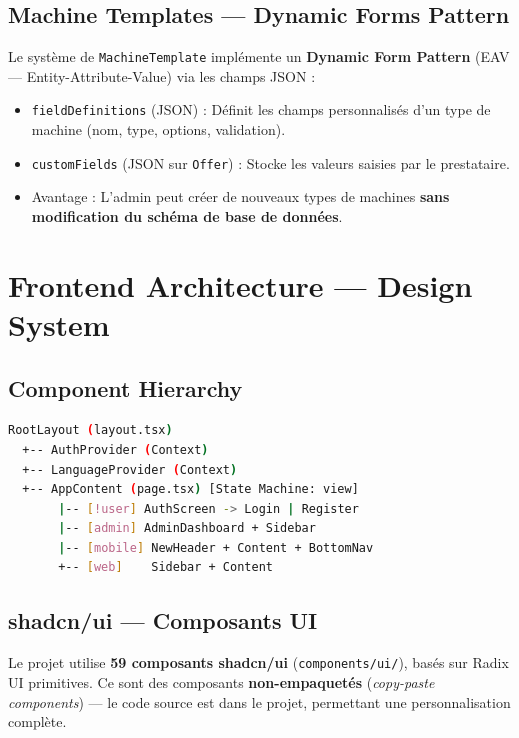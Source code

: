 \documentclass[12pt, a4paper]{article}
\begin{document}
\subsection{Machine Templates — Dynamic Forms Pattern}

Le système de \texttt{MachineTemplate} implémente un \textbf{Dynamic Form Pattern} (EAV — Entity-Attribute-Value) via les champs JSON :

\begin{itemize}[leftmargin=2em]
  \item \texttt{fieldDefinitions} (JSON) : Définit les champs personnalisés d'un type de machine (nom, type, options, validation).
  \item \texttt{customFields} (JSON sur \texttt{Offer}) : Stocke les valeurs saisies par le prestataire.
  \item Avantage : L'admin peut créer de nouveaux types de machines \textbf{sans modification du schéma de base de données}.
\end{itemize}

\section{Frontend Architecture — Design System}

\subsection{Component Hierarchy}

\begin{lstlisting}[language=bash, caption=Hierarchie des composants]
RootLayout (layout.tsx)
  +-- AuthProvider (Context)
  +-- LanguageProvider (Context)
  +-- AppContent (page.tsx) [State Machine: view]
       |-- [!user] AuthScreen -> Login | Register
       |-- [admin] AdminDashboard + Sidebar
       |-- [mobile] NewHeader + Content + BottomNav
       +-- [web]    Sidebar + Content
\end{lstlisting}

\subsection{shadcn/ui — Composants UI}

Le projet utilise \textbf{59 composants shadcn/ui} (\texttt{components/ui/}), basés sur Radix UI primitives. Ce sont des composants \textbf{non-empaquetés} (\textit{copy-paste components}) — le code source est dans le projet, permettant une personnalisation complète.
\end{document}

